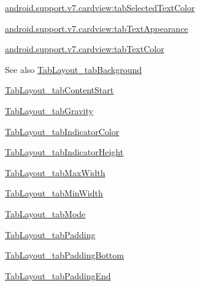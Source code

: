 {\ttfamily \hyperlink{classandroid_1_1support_1_1v7_1_1cardview_1_1R_1_1styleable_abd3588bf878b74235a5268f7295f3b4f}{android.\+support.\+v7.\+cardview\+:tab\+Selected\+Text\+Color}}

{\ttfamily \hyperlink{classandroid_1_1support_1_1v7_1_1cardview_1_1R_1_1styleable_aac67299d9b8c00968768c8064795f58f}{android.\+support.\+v7.\+cardview\+:tab\+Text\+Appearance}}

{\ttfamily \hyperlink{classandroid_1_1support_1_1v7_1_1cardview_1_1R_1_1styleable_a7fa5e53bc11e58338a76405ddc2a9fd8}{android.\+support.\+v7.\+cardview\+:tab\+Text\+Color}}

\begin{DoxySeeAlso}{See also}
\hyperlink{classandroid_1_1support_1_1v7_1_1cardview_1_1R_1_1styleable_a92606b2725987ce07684e8a6f7e3e136}{Tab\+Layout\+\_\+tab\+Background} 

\hyperlink{classandroid_1_1support_1_1v7_1_1cardview_1_1R_1_1styleable_ad3da5de5c86701f6df05c289f3be2530}{Tab\+Layout\+\_\+tab\+Content\+Start} 

\hyperlink{classandroid_1_1support_1_1v7_1_1cardview_1_1R_1_1styleable_a1a68091dcc77c9282baf3784559785fe}{Tab\+Layout\+\_\+tab\+Gravity} 

\hyperlink{classandroid_1_1support_1_1v7_1_1cardview_1_1R_1_1styleable_a5a446283d0134089aec8213efafa7b65}{Tab\+Layout\+\_\+tab\+Indicator\+Color} 

\hyperlink{classandroid_1_1support_1_1v7_1_1cardview_1_1R_1_1styleable_a1105a0d35da90cf70f0f89791a05d979}{Tab\+Layout\+\_\+tab\+Indicator\+Height} 

\hyperlink{classandroid_1_1support_1_1v7_1_1cardview_1_1R_1_1styleable_aad4a6769c12845096dbfe0535274c45c}{Tab\+Layout\+\_\+tab\+Max\+Width} 

\hyperlink{classandroid_1_1support_1_1v7_1_1cardview_1_1R_1_1styleable_a02d9b59abfd1ddbbe8c4d2e6062f03a5}{Tab\+Layout\+\_\+tab\+Min\+Width} 

\hyperlink{classandroid_1_1support_1_1v7_1_1cardview_1_1R_1_1styleable_aa12cc853d9a48dbe68c02155169f3221}{Tab\+Layout\+\_\+tab\+Mode} 

\hyperlink{classandroid_1_1support_1_1v7_1_1cardview_1_1R_1_1styleable_adb8179e42e0e5cad97cc015e8c4569c0}{Tab\+Layout\+\_\+tab\+Padding} 

\hyperlink{classandroid_1_1support_1_1v7_1_1cardview_1_1R_1_1styleable_ae40b7013d65d0b7702c09dc73558e5d1}{Tab\+Layout\+\_\+tab\+Padding\+Bottom} 

\hyperlink{classandroid_1_1support_1_1v7_1_1cardview_1_1R_1_1styleable_a1ad3770f59bb7fecbbaafe593ca05da6}{Tab\+Layout\+\_\+tab\+Padding\+End} 


\end{DoxySeeAlso}
